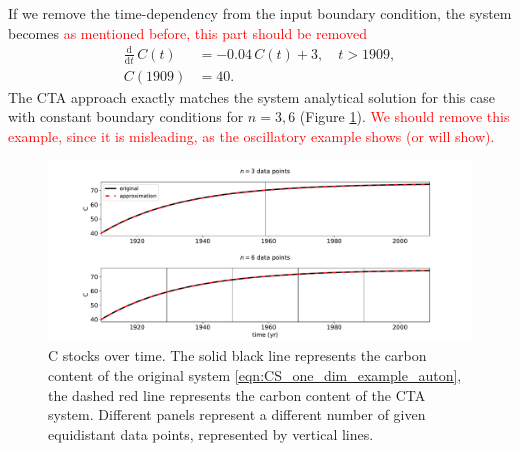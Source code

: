 \documentclass[11pt,a4paper]{article}
\newcommand{\red}[1]{\textcolor{red}{#1}}
\newcommand{\deriv}[1]{\frac{\mathrm{d}}{\mathrm{d}#1}}
\begin{document}
If we remove the time-dependency from the input boundary condition, the system becomes
\red{as mentioned before, this part should be removed}
\begin{equation}\label{eqn:CS_one_dim_example_auton}
    \begin{aligned}
        \deriv{t}\,C(t) &= -0.04\,C(t) + 3,\quad t>1909,\\
        C(1909) &= 40.
    \end{aligned}
\end{equation}
The CTA approach exactly matches the system analytical solution for this case with constant boundary conditions for $n=3,6$ (Figure \ref{fig:CS_one_dim_example_auton}).
\red{We should remove this example, since it is misleading, as the oscillatory example shows (or will show).}

\begin{figure}[htbp]
    \centering 
    \includegraphics[width=1.0\linewidth]{figs/interpol_pwc_1_auton.pdf}
    \caption{C stocks over time.
        The solid black line represents the carbon content of the original system \eqref{eqn:CS_one_dim_example_auton}, the dashed red line represents the carbon content of the CTA system.
        Different panels represent a different number of given equidistant data points, represented by vertical lines.
        }
    \label{fig:CS_one_dim_example_auton}
\end{figure}        
\end{document}
